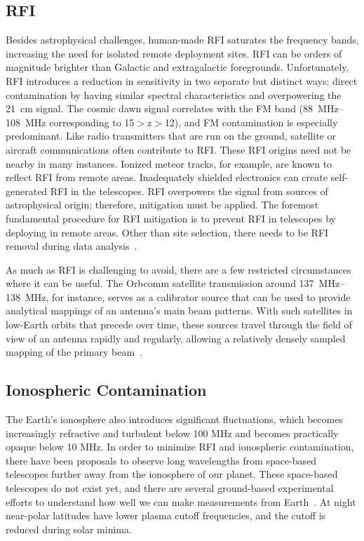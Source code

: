 \subsection*{RFI}

Besides astrophysical challenges, human-made RFI saturates the frequency bands, increasing the need for isolated remote deployment sites. RFI can be orders of magnitude brighter than Galactic and extragalactic foregrounds. Unfortunately, RFI introduces a reduction in sensitivity in two separate but distinct ways: direct contamination by having similar spectral characteristics and overpowering the \SI{21}{\centi \meter} signal. The cosmic dawn signal correlates with the FM band (\SIrange{88}{108}{\mega \hertz} corresponding to 15$>$z$>$12), and FM contamination is especially predominant. Like radio transmitters that are run on the ground, satellite or aircraft communications often contribute to RFI. These RFI origins need not be nearby in many instances. Ionized meteor tracks, for example, are known to reflect RFI from remote areas. Inadequately shielded electronics can create self-generated RFI in the telescopes. RFI overpowers the signal from sources of astrophysical origin; therefore, mitigation must be applied. The foremost fundamental procedure for RFI mitigation is to prevent RFI in telescopes by deploying in remote areas. Other than site selection, there needs to be RFI removal during data analysis~\citep{2020PASP..132f2001L}. 

As much as RFI is challenging to avoid, there are a few restricted circumstances where it can be useful. The Orbcomm satellite transmission around \SIrange{137}{138}{\mega \hertz}, for instance, serves as a calibrator source that can be used to provide analytical mappings of an antenna's main beam patterns. With such satellites in low-Earth orbits that precede over time, these sources travel through the field of view of an antenna rapidly and regularly,  allowing a relatively densely sampled mapping of the primary beam~\citep{2015RaSc...50..614N, 2018PASA...35...45L}. 

\subsection*{Ionospheric Contamination}

The Earth's ionosphere also introduces significant fluctuations, which becomes increasingly refractive and turbulent below 100 MHz and becomes practically opaque below 10 MHz. In order to minimize RFI and ionospheric contamination, there have been proposals to observe long wavelengths from space-based telescopes further away from the ionosphere of our planet. These space-based telescopes do not exist yet, and there are several ground-based experimental efforts to understand how well we can make measurements from Earth~\citep{2019arXiv190710853C, 2019arXiv190804296K}. At night near-polar latitudes have lower plasma cutoff frequencies, and the cutoff is reduced during solar minima.

